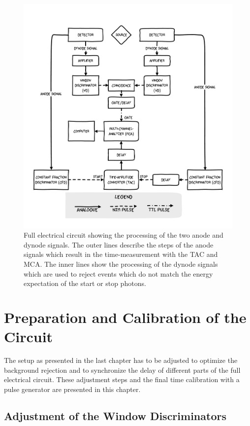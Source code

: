 \documentclass[
	paper=A4,
	parskip=full,
	chapterprefix=true,
	11pt,
	headings=normal,
	bibliography=totoc,
	listof=totoc,
	titlepage=on,
]{scrreprt}
\begin{document}
\begin{figure}
	\centering
	\includegraphics{aufbau}
	\caption{Full electrical circuit showing the processing of the two anode and dynode signals. The outer lines describe the steps of the anode signals which result in the time-measurement with the TAC and MCA. The inner lines show the processing of the dynode signals which are used to reject events which do not match the energy expectation of the start or stop photons.}
	\label{fig:full_circuit}
\end{figure}


\chapter{Preparation and Calibration of the Circuit}
The setup as presented in the last chapter has to be adjusted to optimize the background rejection and to synchronize the delay of different parts of the full electrical circuit. These adjustment steps and the final time calibration with a pulse generator are presented in this chapter.
\section{Adjustment of the Window Discriminators}
\end{document}
